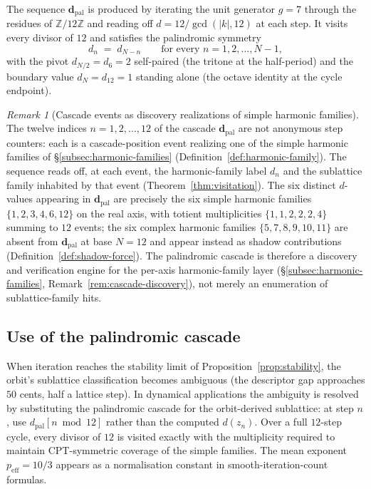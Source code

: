 \documentclass[11pt,a4paper]{article}
\theoremstyle{definition}
\theoremstyle{remark}
\newtheorem{remark}[theorem]{Remark}
\newcommand{\Z}{\mathbb{Z}}
\begin{document}
The sequence $\mathbf{d}_{\mathrm{pal}}$ is produced by iterating the unit generator $g=7$ through the residues of $\Z/12\Z$ and reading off $d = 12/\gcd(|k|,12)$ at each step. It visits every divisor of $12$ and satisfies the palindromic symmetry
\begin{equation}\label{eq:palindrome}
d_{n} \;=\; d_{N-n} \qquad\text{for every } n = 1,2,\ldots,N-1,
\end{equation}
with the pivot $d_{N/2}=d_{6}=2$ self-paired (the tritone at the half-period) and the boundary value $d_{N}=d_{12}=1$ standing alone (the octave identity at the cycle endpoint).

\begin{remark}[Cascade events as discovery realizations of simple harmonic families]\label{rem:events-as-realizations}
The twelve indices $n=1,2,\ldots,12$ of the cascade $\mathbf{d}_{\mathrm{pal}}$ are not anonymous step counters: each is a cascade-position event realizing one of the simple harmonic families of \S\ref{subsec:harmonic-families} (Definition~\ref{def:harmonic-family}). The sequence reads off, at each event, the harmonic-family label $d_{n}$ and the sublattice family inhabited by that event (Theorem~\ref{thm:visitation}). The six distinct $d$-values appearing in $\mathbf{d}_{\mathrm{pal}}$ are precisely the six simple harmonic families $\{1,2,3,4,6,12\}$ on the real axis, with totient multiplicities $\{1,1,2,2,2,4\}$ summing to $12$ events; the six complex harmonic families $\{5,7,8,9,10,11\}$ are absent from $\mathbf{d}_{\mathrm{pal}}$ at base $N=12$ and appear instead as shadow contributions (Definition~\ref{def:shadow-force}). The palindromic cascade is therefore a discovery and verification engine for the per-axis harmonic-family layer (\S\ref{subsec:harmonic-families}, Remark~\ref{rem:cascade-discovery}), not merely an enumeration of sublattice-family hits.
\end{remark}

\subsection{Use of the palindromic cascade}

When iteration reaches the stability limit of Proposition~\ref{prop:stability}, the orbit's sublattice classification becomes ambiguous (the descriptor gap approaches $50$ cents, half a lattice step). In dynamical applications the ambiguity is resolved by substituting the palindromic cascade for the orbit-derived sublattice: at step $n$, use $d_{\mathrm{pal}}[n\bmod 12]$ rather than the computed $d(z_{n})$. Over a full $12$-step cycle, every divisor of $12$ is visited exactly with the multiplicity required to maintain CPT-symmetric coverage of the simple families. The mean exponent $p_{\mathrm{eff}}=10/3$ appears as a normalisation constant in smooth-iteration-count formulas.
\end{document}
